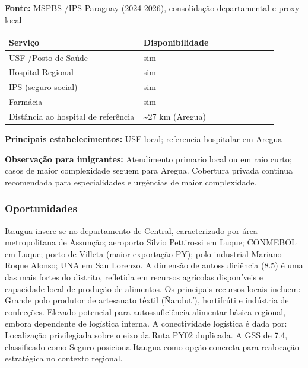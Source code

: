 \textbf{Fonte:} MSPBS /\allowbreak  IPS Paraguay (2024-2026), consolidação
departamental e proxy local

{\def\LTcaptype{none} %
\begin{longtable}{@{}>{\raggedright\arraybackslash}p{0.45\linewidth} >{\raggedright\arraybackslash}p{0.45\linewidth}@{}}
\toprule\noalign{}
Serviço & Disponibilidade \\
\midrule\noalign{}
\endhead
\bottomrule\noalign{}
\endlastfoot
USF /\allowbreak  Posto de Saúde & sim \\
Hospital Regional & sim \\
IPS (seguro social) & sim \\
Farmácia & sim \\
Distância ao hospital de referência & \textasciitilde27 km (Aregua) \\
\end{longtable}
}

\textbf{Principais estabelecimentos:} USF local; referencia hospitalar
em Aregua

\textbf{Observação para imigrantes:} Atendimento primario local ou em
raio curto; casos de maior complexidade seguem para Aregua. Cobertura
privada continua recomendada para especialidades e urgências de maior
complexidade.
\newpage

\subsubsection*{Oportunidades}\label{oport-itaugua-1106}
Itaugua insere-se no departamento de Central, caracterizado por área metropolitana de Assunção; aeroporto Silvio Pettirossi em Luque; CONMEBOL em Luque; porto de Villeta (maior exportação PY); polo industrial Mariano Roque Alonso; UNA em San Lorenzo. A dimensão de autossuficiência (8.5) é uma das mais fortes do distrito, refletida em recursos agrícolas disponíveis e capacidade local de produção de alimentos. Os principais recursos locais incluem: Grande polo produtor de artesanato têxtil (Ñandutí), hortifrúti e indústria de confecções. Elevado potencial para autossuficiência alimentar básica regional, embora dependente de logística interna. A conectividade logística é dada por: Localização privilegiada sobre o eixo da Ruta PY02 duplicada. A GSS de 7.4, classificado como Seguro posiciona Itaugua como opção concreta para realocação estratégica no contexto regional.

